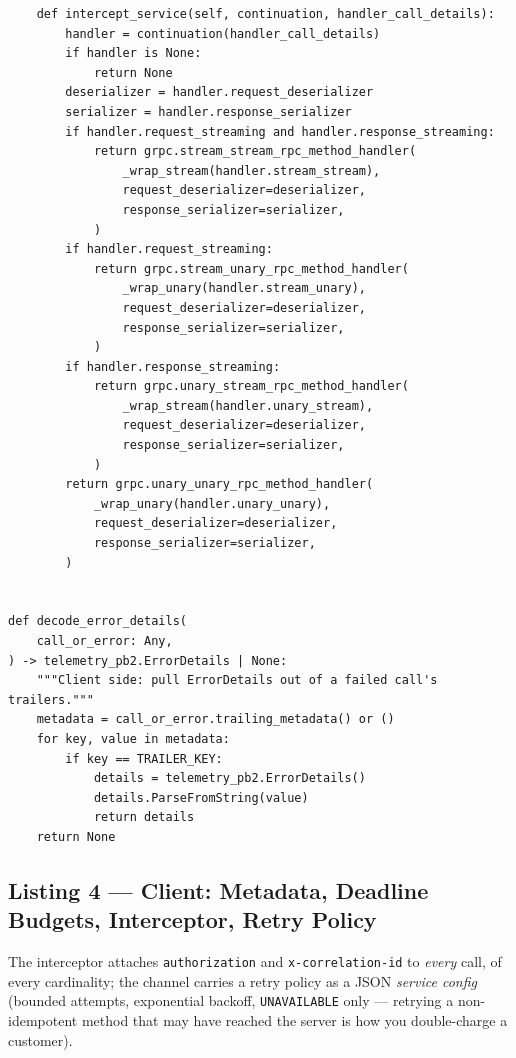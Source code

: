 \begin{verbatim}
    def intercept_service(self, continuation, handler_call_details):
        handler = continuation(handler_call_details)
        if handler is None:
            return None
        deserializer = handler.request_deserializer
        serializer = handler.response_serializer
        if handler.request_streaming and handler.response_streaming:
            return grpc.stream_stream_rpc_method_handler(
                _wrap_stream(handler.stream_stream),
                request_deserializer=deserializer,
                response_serializer=serializer,
            )
        if handler.request_streaming:
            return grpc.stream_unary_rpc_method_handler(
                _wrap_unary(handler.stream_unary),
                request_deserializer=deserializer,
                response_serializer=serializer,
            )
        if handler.response_streaming:
            return grpc.unary_stream_rpc_method_handler(
                _wrap_stream(handler.unary_stream),
                request_deserializer=deserializer,
                response_serializer=serializer,
            )
        return grpc.unary_unary_rpc_method_handler(
            _wrap_unary(handler.unary_unary),
            request_deserializer=deserializer,
            response_serializer=serializer,
        )


def decode_error_details(
    call_or_error: Any,
) -> telemetry_pb2.ErrorDetails | None:
    """Client side: pull ErrorDetails out of a failed call's trailers."""
    metadata = call_or_error.trailing_metadata() or ()
    for key, value in metadata:
        if key == TRAILER_KEY:
            details = telemetry_pb2.ErrorDetails()
            details.ParseFromString(value)
            return details
    return None
\end{verbatim}

\subsection{Listing 4 --- Client: Metadata, Deadline Budgets, Interceptor, Retry Policy}
\label{subsec:ch13-code-client}

The interceptor attaches \texttt{authorization} and \texttt{x-correlation-id}
to \emph{every} call, of every cardinality; the channel carries a retry policy
as a JSON \emph{service config} (bounded attempts, exponential backoff,
\texttt{UNAVAILABLE} only --- retrying a non-idempotent method that may have
reached the server is how you double-charge a customer).

